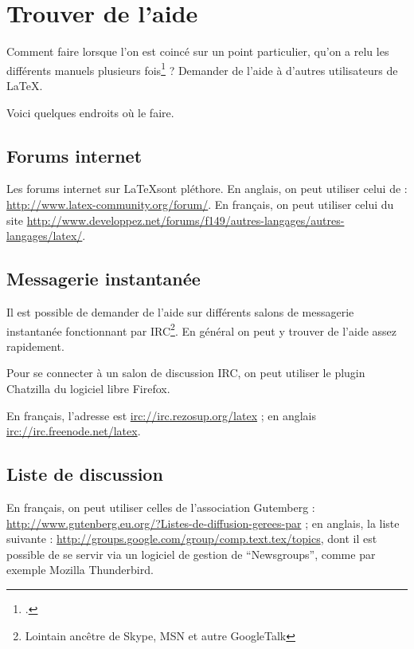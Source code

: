\chapter{Trouver de l'aide}

\begin{intro}
Comment faire lorsque l'on est coincé sur un point particulier, qu'on a relu les différents manuels plusieurs fois\footcite[Signalons au passage la possibilité de télécharger une aide sur l'ensemble des erreurs de compilation avec \LaTeX :][]{erreurscompilo} ? Demander de l'aide à d'autres utilisateurs de \LaTeX{}.

Voici quelques endroits où le faire. 
\end{intro}


\section{Forums internet}

Les forums internet sur \LaTeX sont pléthore. En anglais, on peut utiliser celui de  : \url{http://www.latex-community.org/forum/}. En français, on peut utiliser celui du site  \url{http://www.developpez.net/forums/f149/autres-langages/autres-langages/latex/}.


\section{Messagerie instantanée}

Il est possible de demander de l'aide sur différents salons de messagerie instantanée fonctionnant par IRC\footnote{Lointain ancêtre de Skype, MSN et autre GoogleTalk}. En général on peut y trouver de l'aide assez rapidement.

Pour se connecter à un salon de discussion IRC, on peut utiliser le plugin Chatzilla du logiciel libre Firefox.

En français, l'adresse est \url{irc://irc.rezosup.org/latex} ; en anglais
\url{irc://irc.freenode.net/latex}.


\section{Liste de discussion}

En français, on peut utiliser celles de l'association Gutemberg : \url{http://www.gutenberg.eu.org/?Listes-de-diffusion-gerees-par} ; en anglais,  la liste suivante : \url{http://groups.google.com/group/comp.text.tex/topics}, dont il est possible de se servir via un logiciel de gestion de \enquote{Newsgroups}, comme par exemple Mozilla Thunderbird.
